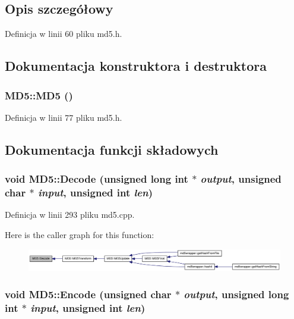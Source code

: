 \subsection{Opis szczegółowy}


Definicja w linii 60 pliku md5.h.

\subsection{Dokumentacja konstruktora i destruktora}
\hypertarget{a00002_fa6155ec36de415ab2dcf5e54b670d13}{
\subsubsection[{MD5}]{\setlength{\rightskip}{0pt plus 5cm}MD5::MD5 ()}}
\label{d7/d46/a00002_fa6155ec36de415ab2dcf5e54b670d13}




Definicja w linii 77 pliku md5.h.

\subsection{Dokumentacja funkcji składowych}
\hypertarget{a00002_ef62580b93f2122c62493464787b814a}{
\subsubsection[{Decode}]{\setlength{\rightskip}{0pt plus 5cm}void MD5::Decode (unsigned long int $\ast$ {\em output}, \/  unsigned char $\ast$ {\em input}, \/  unsigned int {\em len})}}
\label{d7/d46/a00002_ef62580b93f2122c62493464787b814a}




Definicja w linii 293 pliku md5.cpp.

Here is the caller graph for this function:\nopagebreak
\begin{figure}[H]
\begin{center}
\leavevmode
\includegraphics[width=420pt]{d7/d46/a00002_ef62580b93f2122c62493464787b814a_icgraph}
\end{center}
\end{figure}
\hypertarget{a00002_c3c05716498203127920ba78b3ae8115}{
\subsubsection[{Encode}]{\setlength{\rightskip}{0pt plus 5cm}void MD5::Encode (unsigned char $\ast$ {\em output}, \/  unsigned long int $\ast$ {\em input}, \/  unsigned int {\em len})}}
\label{d7/d46/a00002_c3c05716498203127920ba78b3ae8115}




